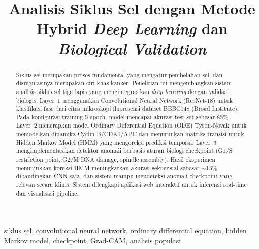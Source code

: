 \documentclass[conference]{IEEEtran}
\begin{document}
\title{Analisis Siklus Sel dengan Metode Hybrid \textit{Deep Learning} dan \textit{Biological Validation}}

\author{
\and
{}
\and
{}
\and
{}
}

\maketitle

\begin{abstract}
Siklus sel merupakan proses fundamental yang mengatur pembelahan sel, dan disregulasinya merupakan ciri khas kanker. Penelitian ini mengembangkan sistem analisis siklus sel tiga lapis yang mengintegrasikan \textit{deep learning} dengan validasi biologis. Layer~1 menggunakan Convolutional Neural Network (ResNet-18) untuk klasifikasi fase dari citra mikroskopi fluoresensi dataset BBBC048 (Broad Institute). Pada konfigurasi training 5 epoch, model mencapai akurasi test set sebesar 85\%. Layer~2 menerapkan model Ordinary Differential Equation (ODE) Tyson-Novak untuk memodelkan dinamika Cyclin B/CDK1/APC dan menurunkan matriks transisi untuk Hidden Markov Model (HMM) yang mengoreksi prediksi temporal. Layer~3 mengimplementasikan detektor anomali berbasis aturan biologi checkpoint (G1/S restriction point, G2/M DNA damage, spindle assembly). Hasil eksperimen menunjukkan koreksi HMM meningkatkan akurasi sekuensial sebesar $\sim$15\% dibandingkan CNN saja, dan sistem mampu mendeteksi anomali checkpoint yang relevan secara klinis. Sistem dilengkapi aplikasi web interaktif untuk inferensi real-time dan visualisasi pipeline.
\end{abstract}

\begin{IEEEkeywords}
siklus sel, convolutional neural network, ordinary differential equation, hidden Markov model, checkpoint, Grad-CAM, analisis populasi
\end{IEEEkeywords}
\end{document}
